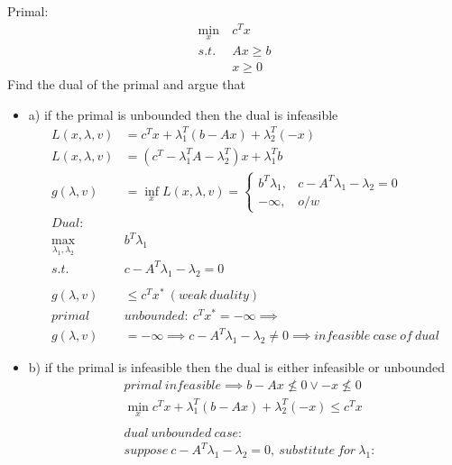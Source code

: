 \documentclass[12pt,letter]{article}
\begin{document}
\begin{enumerate}
  Primal:
  \begin{align*}
    \min_x\ & c^Tx\\
    s.t.\ & Ax \geq b\\
           & x \geq 0
  \end{align*}
  Find the dual of the primal and argue that
  \begin{itemize}
  \item a) if the primal is unbounded then the dual is infeasible
    \begin{align*}
      L(x,\lambda,v) &= c^Tx + \lambda_1^T(b-Ax) + \lambda_2^T(-x)\\
      L(x,\lambda,v) &= (c^T-\lambda_1^TA -\lambda_2^T)x + \lambda_1^Tb\\
      g(\lambda,v) &= \inf_x L(x,\lambda,v) =
      \begin{cases}
        b^T\lambda_1, & c -A^T\lambda_1-\lambda_2 = 0\\
        -\infty, & o/w
      \end{cases}\\
      Dual:\\
      \max_{\lambda_1,\lambda_2}\ & b^T\lambda_1\\
      s.t.\ & c - A^T\lambda_1 - \lambda_2 = 0\\
      \\
      g(\lambda,v) &\leq c^Tx^*\ (weak\ duality)\\
      primal\ & unbounded:\ c^Tx^*= -\infty \implies\\
      g(\lambda,v) &= -\infty \implies c -A^T\lambda_1-\lambda_2 \neq 0 \implies infeasible\ case\ of\ dual
    \end{align*}
  \item b) if the primal is infeasible then the dual is either infeasible or unbounded
    \begin{align*}
      &primal\ infeasible \implies b-Ax \not\leq 0 \vee -x \not\leq 0\\
      &\min_x c^Tx +\lambda_1^T(b-Ax) + \lambda_2^T(-x) \leq c^Tx\\
      \\
      &dual\ unbounded\ case:\\
      &suppose\ c - A^T\lambda_1 - \lambda_2 = 0,\ substitute\ for\ \lambda_1:\\

\end{align*}
\end{itemize}
\end{enumerate}
\end{document}
